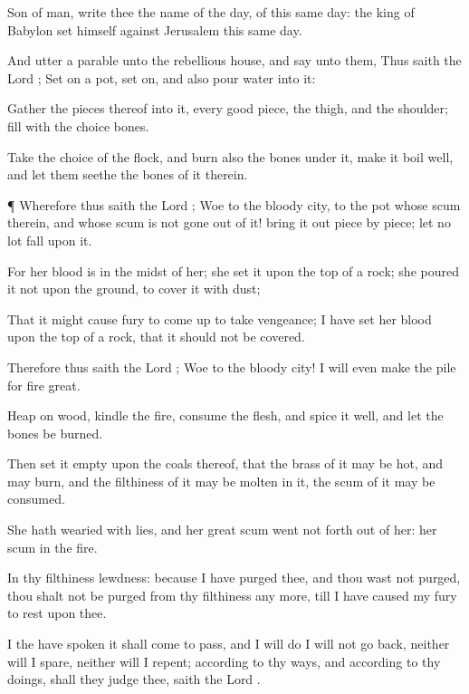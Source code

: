 {Son of
man,
write thee the
name of the
day,
{} of this
same
day: the
king of
Babylon
set himself against
Jerusalem this
same
day.

And
utter a
parable unto the
rebellious
house, and
say unto them, Thus
saith the
Lord
{}; Set
on a
pot, set
{}
on, and also
pour
water into it:

Gather the
pieces thereof into it,
{} every
good
piece, the
thigh, and the
shoulder;
fill
{} with the
choice
bones.

Take the
choice of the
flock, and
burn also the
bones under it,
{} make it
boil
well, and let them
seethe the
bones of it
therein.


\par }{\PP {}¶ Wherefore thus
saith the
Lord
{};
Woe to the
bloody
city, to the
pot whose
scum
{} therein, and whose
scum is not gone
out of it! bring it
out
piece by
piece; let no
lot
fall upon it.

For her
blood is in the
midst of her; she
set it upon the
top of a
rock; she
poured it not upon the
ground, to
cover it with
dust;

That it might cause
fury to come
up to
take
vengeance; I have
set her
blood upon the
top of a
rock, that it should not be
covered.

Therefore thus
saith the
Lord
{};
Woe to the
bloody
city! I will even make the
pile for fire
great.

Heap on
wood,
kindle the
fire,
consume the
flesh, and
spice it
well, and let the
bones be
burned.

Then
set it
empty upon the
coals thereof, that the
brass of it may be
hot, and may
burn, and
{} the
filthiness of it may be
molten in
it,
{} the
scum of it may be
consumed.

She hath
wearied
{} with
lies, and her
great
scum went not
forth out of her: her
scum
{} in the
fire.

In thy
filthiness
{}
lewdness: because I have
purged thee, and thou wast not
purged, thou shalt not be
purged from thy
filthiness any more, till I have caused my
fury to
rest upon thee.

I the
{} have
spoken
{} it shall come to
pass, and I will
do
{} I will not go
back, neither will I
spare, neither will I
repent; according to thy
ways, and according to thy
doings, shall they
judge thee,
saith the
Lord
{}.


}
